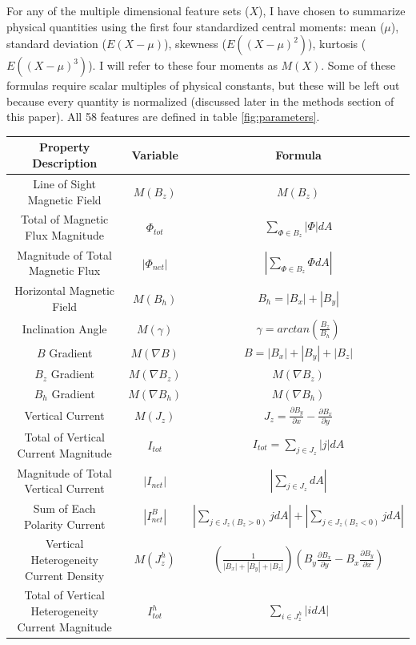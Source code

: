 For any of the multiple dimensional feature sets ($X$), I have chosen to summarize physical quantities using the first four standardized central moments: mean ($\mu$), standard deviation ($E(X - \mu)$), skewness ($E((X - \mu)^2)$), kurtosis ($E((X - \mu)^3)$). I will refer to these four moments as $M(X)$. Some of these formulas require scalar multiples of physical constants, but these will be left out because every quantity is normalized (discussed later in the methods section of this paper). All 58 features are defined in table \ref{fig:parameters}.
\renewcommand{\arraystretch}{1.8}
\begin{table}[p!]
\centering
\begin{tabular}{||c c c||} 
 \hline
 Property Description & Variable & Formula \\ [0.5ex] 
 \hline\hline
 Line of Sight Magnetic Field & $M(B_z)$ & $M(B_z)$\\ 
 \hline
 Total of Magnetic Flux Magnitude & $\Phi_{tot}$ & $\sum_{\Phi \in B_z}|\Phi|dA$ \\
 \hline
 Magnitude of Total Magnetic Flux & $|\Phi_{net}|$ & $|\sum_{\Phi \in B_z}\Phi dA|$ \\
 \hline
 Horizontal Magnetic Field & $M(B_h)$ & $B_h = |B_x| + |B_y|$ \\
 \hline 
 Inclination Angle & $M(\gamma)$ & $\gamma = arctan(\frac{B_z}{B_h})$ \\
 \hline
 $B$ Gradient & $M(\nabla B)$ & $B = |B_x| + |B_y| + |B_z|$ \\
 \hline
 $B_z$ Gradient & $M(\nabla B_z)$ & $M(\nabla B_z)$ \\
 \hline
 $B_h$ Gradient & $M(\nabla B_h)$ & $M(\nabla B_h)$ \\
 \hline
 Vertical Current & $M(J_z)$ & $J_z = \frac{\partial B_y}{\partial x} - \frac{\partial B_x}{\partial y}$ \\
 \hline
 Total of Vertical Current Magnitude & $I_{tot}$ & $I_{tot} = \sum_{j \in J_z}|j|dA$ \\
 \hline
 Magnitude of Total Vertical Current & $|I_{net}|$ & $|\sum_{j \in J_z}dA|$\\
 \hline
 Sum of Each Polarity Current & $|I_{net}^B|$ & $|\sum_{j \in J_z(B_z > 0)}jdA| + |\sum_{j \in J_z(B_z < 0)}j dA|$ \\
 \hline 
 Vertical Heterogeneity Current Density & $M(J_z^h)$ & $(\frac{1}{|B_x| + |B_y| + |B_z|})(B_y \frac{\partial B_x}{\partial y} - B_x \frac{\partial B_y}{\partial x})$\\
 \hline 
 Total of Vertical Heterogeneity Current Magnitude & $I_{tot}^h$ & $\sum_{i \in J_z^h}|idA|$ \\

\end{tabular}
\end{table}
